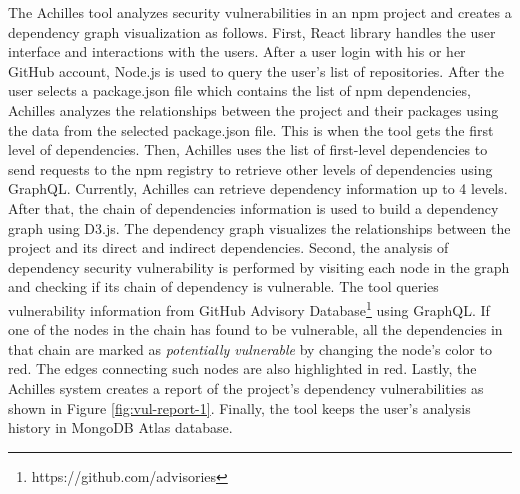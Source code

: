 \documentclass[conference]{IEEEtran}
\begin{document}
    The Achilles tool analyzes security vulnerabilities in an npm project and creates a dependency graph visualization as follows.
    First, React library handles the user interface and interactions with the users. After a user login with his or her GitHub account, Node.js is used to query the user's list of repositories. After the user selects a package.json file which contains the list of npm dependencies, Achilles analyzes the relationships between the project and their packages using the data from the selected package.json file. This is when the tool gets the first level of dependencies. Then, Achilles  uses the list of first-level dependencies to send requests to the npm registry to retrieve other levels of dependencies using GraphQL. Currently, Achilles can retrieve dependency information up to 4 levels.
    After that, the chain of dependencies information is used to build a dependency graph using D3.js. The dependency graph visualizes the relationships between the project and its direct and indirect dependencies.
    Second, the analysis of dependency security vulnerability is performed by visiting each node in the graph and checking if its chain of dependency is vulnerable. The tool queries vulnerability information from GitHub Advisory Database\footnote{https://github.com/advisories} using GraphQL. If one of the nodes in the chain has found to be vulnerable, all the dependencies in that chain are marked as \textit{potentially vulnerable} by changing the node's color to red. The edges connecting such nodes are also highlighted in red. 
    Lastly, the Achilles system creates a report of the project's dependency vulnerabilities as shown in Figure \ref{fig:vul-report-1}.
    Finally, the tool keeps the user's analysis history in MongoDB Atlas database.
        

\end{document}

